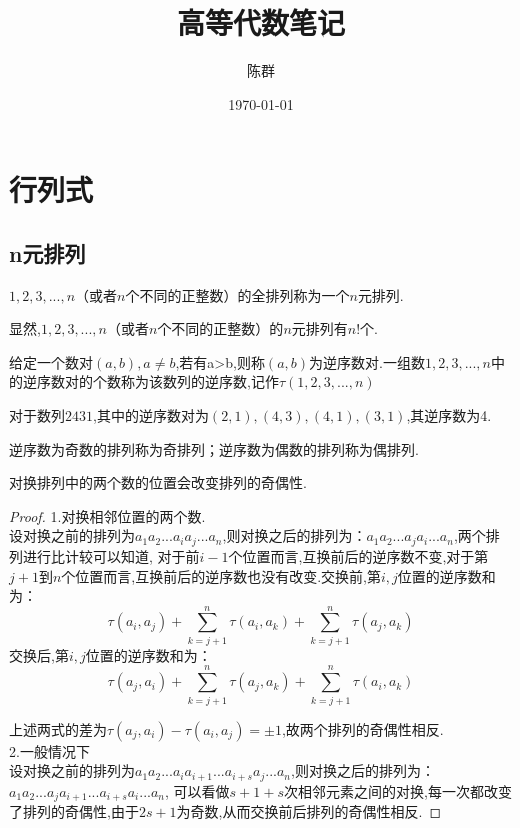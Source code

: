 \documentclass[blue,normal,cn]{elegantnote}
\title{高等代数笔记}
\author{陈群}
\date{\today}
\begin{document}
\tableofcontents
{\color{ecolor}{\maketitle}}


\section{行列式}
\subsection{n元排列}

\begin{definition}[$n$元排列]
$1,2,3,...,n$（或者$n$个不同的正整数）的全排列称为一个$n$元排列.
\end{definition}
显然,$1,2,3,...,n$（或者$n$个不同的正整数）的$n$元排列有$n!$个.

\begin{definition}[逆序数对和逆序数]
给定一个数对$(a,b),a ≠b $,若有a>b,则称$(a,b)$为逆序数对.一组数$1,2,3,...,n$中的逆序数对的个数称为该数列的逆序数,记作$τ(1,2,3,...,n)$
\end{definition}
对于数列$2431$,其中的逆序数对为$(2,1),(4,3),(4,1),(3,1)$,其逆序数为4.

\begin{definition}[奇排列与偶排列]
逆序数为奇数的排列称为奇排列；逆序数为偶数的排列称为偶排列.
\end{definition}

\begin{theorem}
对换排列中的两个数的位置会改变排列的奇偶性.
\end{theorem}

\begin{proof}
1.对换相邻位置的两个数.\\
设对换之前的排列为$a_1a_2...a_ia_j...a_n$,则对换之后的排列为：$a_1a_2...a_ja_i...a_n$,两个排列进行比计较可以知道,
对于前$i-1$个位置而言,互换前后的逆序数不变,对于第$j+1$到$n$个位置而言,互换前后的逆序数也没有改变.交换前,第$i,j$位置的逆序数和为：
\begin{equation*}
τ(a_i,a_j)+\sum_{k=j+1}^{n}\tau (a_i,a_k)+\sum_{k=j+1}^{n} \tau (a_j,a_k)
\end{equation*}
交换后,第$i,j$位置的逆序数和为：
\begin{equation*}
τ(a_j,a_i)+\sum_{k=j+1}^{n}\tau (a_j,a_k)+\sum_{k=j+1}^{n} \tau (a_i,a_k)
\end{equation*}

上述两式的差为$τ(a_j,a_i)-τ(a_i,a_j)=±1$,故两个排列的奇偶性相反.
\\
2.一般情况下\\
设对换之前的排列为$a_1a_2...a_ia_{i+1}...a_{i+s}a_j...a_n$,则对换之后的排列为：$a_1a_2...a_ja_{i+1}...a_{i+s}a_i...a_n$,
可以看做$s+1+s$次相邻元素之间的对换,每一次都改变了排列的奇偶性,由于$2s+1$为奇数,从而交换前后排列的奇偶性相反.
\end{proof}
\end{document}
